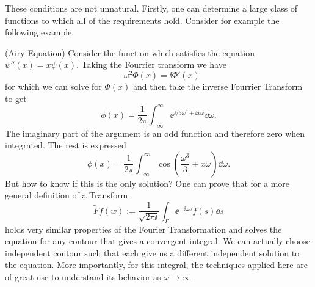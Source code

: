 These conditions are not unnatural. Firstly, one can determine a large class of functions to which all of the requirements hold. Consider for example the following example.

\begin{exemplo}
	(Airy Equation) Consider the function which satisfies the equation $\psi''(x) = x \psi(x)$. Taking the Fourrier transform we have 
	\begin{equation}
		-\omega^2 \Phi(x) = \ii \Phi'(x)
	\end{equation}
	for which we can solve for $\Phi(x) $ and then take the inverse Fourrier Transform to get 
	\begin{equation}
		\phi(x) = \frac{1}{2\pi} \int_{-\infty}^{\infty} \ee^{\ii/3 \omega^3 + \ii x \omega} \dd \omega.
	\end{equation}
 	The imaginary part of the argument is an odd function and therefore zero when integrated. The rest is expressed 
	\begin{equation}
		\phi(x) = \frac{1}{2\pi} \int_{-\infty}^{\infty} \cos{\left( \frac{\omega^3}{3} + x \omega \right)} \dd \omega.
	\end{equation}
 But how to know if this is the only solution? One can prove that for a more general definition of a Transform 
\begin{equation}
	\tilde{F} f(w) := \frac{1}{\sqrt{2\pi \ii}} \int_{\Gamma} \ee^{-\ii \omega s} f(s) \dd s
\end{equation}
 holds very similar properties of the Fourier Transformation and solves the equation for any contour that gives a convergent integral. We can actually choose independent contour such that each give us a different independent solution to the equation. More importantly, for this integral, the techniques applied here are of great use to understand its behavior as $\omega \rightarrow \infty$.
\end{exemplo}

